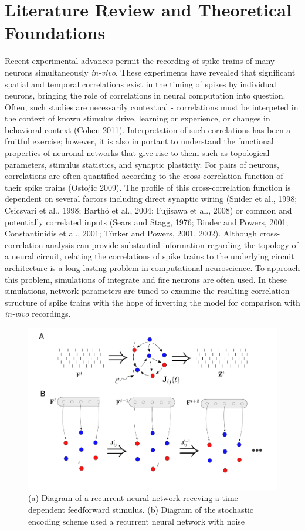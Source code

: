\documentclass{ucetd}
\begin{document}
\section{Literature Review and Theoretical Foundations}


Recent experimental advances permit the recording of spike trains of many neurons simultaneously \emph{in-vivo}. These experiments have revealed that significant spatial and temporal correlations exist in the timing of spikes by individual neurons, bringing the role of correlations in neural computation into question. Often, such studies are necessarily contextual - correlations must be interpeted in the context of known stimulus drive, learning or experience, or changes in behavioral context (Cohen 2011). Interpretation of such correlations has been a fruitful exercise; however, it is also important to understand the functional properties of neuronal networks that give rise to them such as topological parameters, stimulus statistics, and synaptic plasticity. For pairs of neurons, correlations are often quantified according to the cross-correlation function of their spike trains (Ostojic 2009). The profile of this cross-correlation function is dependent on several factors including direct synaptic wiring (Snider et al., 1998; Csicsvari et al., 1998; Barthó et al., 2004; Fujisawa et al., 2008) or common and potentially correlated inputs (Sears and Stagg, 1976; Binder and Powers, 2001; Constantinidis et al., 2001; Türker and Powers, 2001, 2002). Although cross-correlation analysis can provide substantial information regarding the topology of a neural circuit, relating the correlations of spike trains to the underlying circuit architecture is a long-lasting problem in computational neuroscience. To approach this problem, simulations of integrate and fire neurons are often used. In these simulations, network parameters are tuned to examine the resulting correlation structure of spike trains with the hope of inverting the model for comparison with \emph{in-vivo} recordings. 

\begin{figure}[t!]
\centering
\includegraphics[width=150mm]{figure-1}
\caption{(a) Diagram of a recurrent neural network receving a time-dependent feedforward stimulus. (b) Diagram of the stochastic encoding scheme used a recurrent neural network with noise}
\end{figure}
\end{document}
